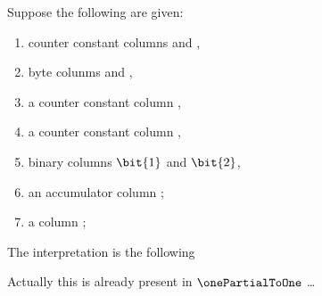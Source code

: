 Suppose the following are given:
\begin{enumerate}
	\item counter constant columns \source{} and \target{},
	\item byte colunms \source\byte{} and \target\byte{},
	\item a counter constant column \source\mark{},
	\item a counter constant column \size{},
	\item binary columns $\bit{1}$ and $\bit{2}$,
	\item an accumulator column \ACC{};
	\item a column ;
\end{enumerate}
The interpretation is the following

Actually this is already present in $\onePartialToOne$ \dots{}
